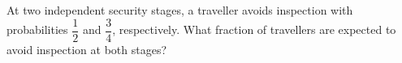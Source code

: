 At two independent security stages, a traveller avoids inspection with probabilities $\dfrac{1}{2}$ and $\dfrac{3}{4}$, respectively. What fraction of travellers are expected to avoid inspection at both stages?
